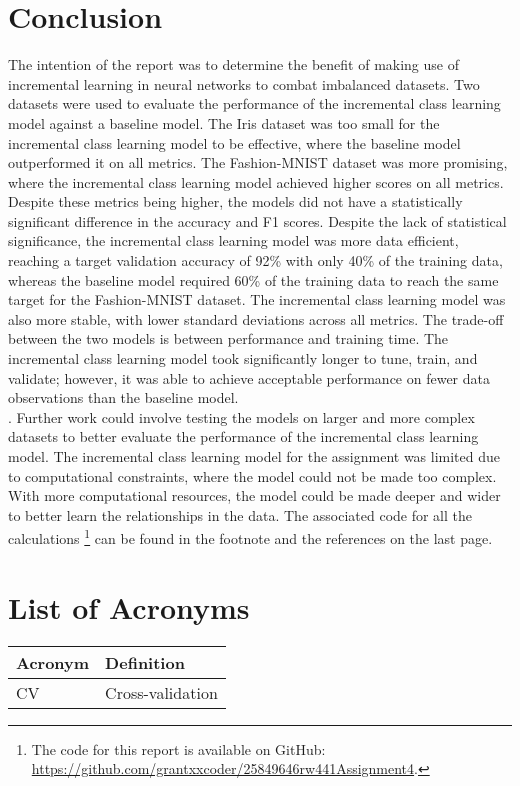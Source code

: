 \documentclass[conference]{IEEEtran}
\begin{document}
\section{Conclusion}
The intention of the report was to determine the benefit of making use of incremental learning in neural networks to combat imbalanced datasets. Two datasets were used to evaluate the performance of the incremental class learning model against a baseline model. The Iris dataset was too small for the incremental class learning model to be effective, where the baseline model outperformed it on all metrics. 
The Fashion-MNIST dataset was more promising, where the incremental class learning model achieved higher scores on all metrics. Despite these metrics being higher, the models 
did not have a statistically significant difference in the accuracy and F1 scores. Despite the lack of statistical significance, the incremental class learning model was more data efficient, reaching a 
target validation accuracy of 92\% with only 40\% of the training data, whereas the baseline model required 60\% of the training data
 to reach the same target for the Fashion-MNIST dataset. The incremental class learning model was also more stable, with lower 
 standard deviations across all metrics. The trade-off between the two models is between performance and training time. The
 incremental class learning model took significantly longer to tune, train, and validate; however, it was able to achieve
 acceptable performance on fewer data observations than the baseline model. \\
\cite{blackard1999forest}.
 Further work could involve testing the models on larger and more complex datasets to better evaluate the performance of the incremental class learning model. The incremental class 
 learning model for the assignment was limited due to computational constraints, where the model could not be made too complex. With more computational resources, the model could be made deeper and wider to better learn the relationships in the data.
 The associated code for all the calculations
\footnote{The code for this report is available on GitHub: \url{https://github.com/grantxxcoder/25849646rw441Assignment4}.} can be found in the footnote and the references on the last page.
\appendix

\section*{List of Acronyms}
\begingroup
\setlength{\tabcolsep}{6pt}
\renewcommand{\arraystretch}{1.05}
\noindent\begin{tabular}{@{}p{}p{}@{}}
\textbf{Acronym} & \textbf{Definition} \\
\midrule
CV & Cross-validation \\
\end{tabular}
\endgroup



\end{document}
